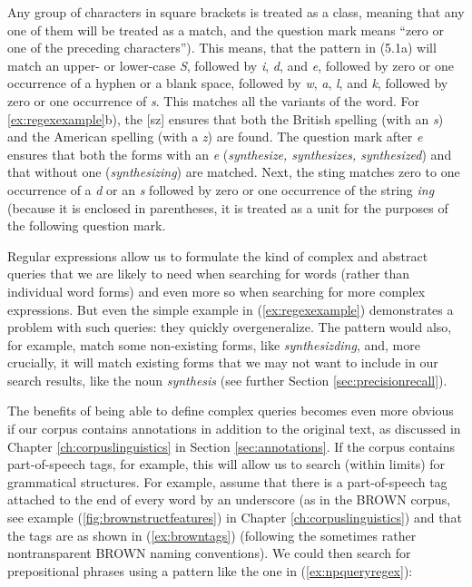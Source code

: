 Any group of characters in square brackets is treated as a class, meaning that any one of them will be treated as a match, and the question mark means ``zero or one of the preceding characters''). This means, that the pattern in (5.1a) will match an upper- or lower-case \textit{S}, followed by \textit{i}, \textit{d}, and \textit{e}, followed by zero or one occurrence of a hyphen or a blank space, followed by \textit{w}, \textit{a}, \textit{l}, and \textit{k}, followed by zero or one occurrence of \textit{s}. This matches all the variants of the word. For \ref{ex:regexexample}b), the [sz] ensures that both the British spelling (with an \textit{s}) and the American spelling (with a \textit{z}) are found. The question mark after \textit{e} ensures that both the forms with an \textit{e} (\textit{synthesize, synthesizes, synthesized}) and that without one (\textit{synthesizing}) are matched. Next, the sting matches zero to one occurrence of a \textit{d} or an \textit{s} followed by zero or one occurrence of the string \textit{ing} (because it is enclosed in parentheses, it is treated as a unit for the purposes of the following question mark.

Regular expressions allow us to formulate the kind of complex and abstract  queries that we are likely to need when searching for words (rather than individual word forms) and even more so when searching for more complex expressions. But even the simple example in (\ref{ex:regexexample}) demonstrates a problem with such queries: they quickly overgeneralize. The pattern would also, for example, match some non-existing forms, like \textit{synthesizding}, and, more crucially, it will match existing forms that we may not want to include in our search results, like the noun \textit{synthesis} (see further Section \ref{sec:precisionrecall}).

The benefits of being able to define complex queries becomes even more obvious if our corpus contains annotations in addition to the original text, as discussed in Chapter \ref{ch:corpuslinguistics} in Section \ref{sec:annotations}. If the corpus contains part-of-speech tags, for example, this will allow us to search (within limits) for grammatical structures. For example, assume that there is a part-of-speech tag attached to the end of every word by an underscore (as in the BROWN corpus, see example (\ref{fig:brownstructfeatures}) in Chapter \ref{ch:corpuslinguistics}) and that the tags are as shown in (\ref{ex:browntags}) (following the sometimes rather nontransparent BROWN naming conventions). We could then search for prepositional phrases using a pattern like the one in (\ref{ex:npqueryregex}):

